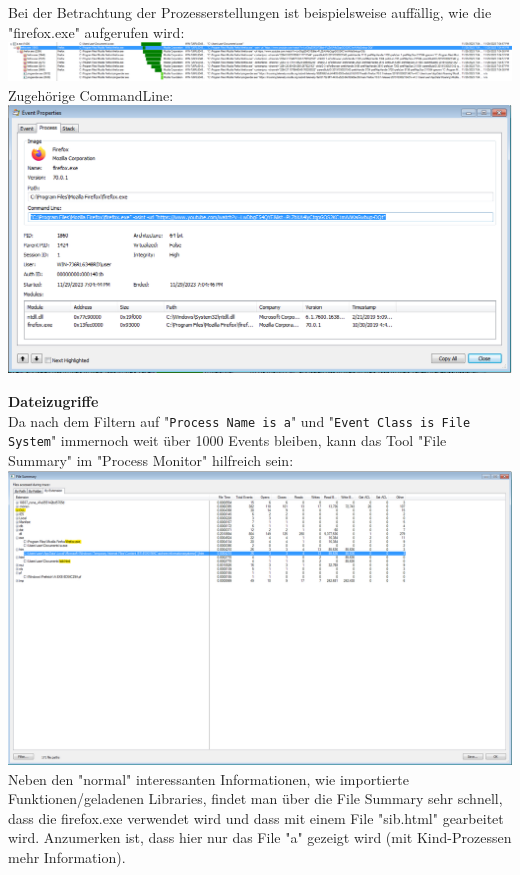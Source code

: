 \documentclass{article}
\begin{document}
	\noindent Bei der Betrachtung der Prozesserstellungen ist beispielsweise auffällig, wie die "firefox.exe" aufgerufen wird:\\
	\includegraphics[width=1\linewidth]{"pictures/2.1 process creation"}\\
	Zugehörige CommandLine:\\
	\includegraphics[width=1\linewidth]{"pictures/2.1 firefox start"}\\
	
	\pagebreak
	
	\noindent\textbf{Dateizugriffe}\\
	Da nach dem Filtern auf "\texttt{Process Name is a}" und "\texttt{Event Class is File System}" immernoch weit über 1000 Events bleiben, kann das Tool "File Summary" im "Process Monitor" hilfreich sein:\\
	\includegraphics[width=1\linewidth]{"pictures/2.2 File Summary"}
	Neben den "normal" interessanten Informationen, wie importierte Funktionen/geladenen Libraries, findet man über die File Summary sehr schnell, dass die firefox.exe verwendet wird und dass mit einem File "sib.html" gearbeitet wird. Anzumerken ist, dass hier nur das File "a" gezeigt wird (mit Kind-Prozessen mehr Information).\\
	
\end{document}
